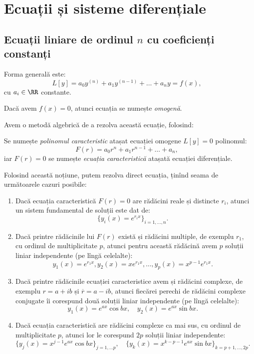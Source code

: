 
\chapter{Ecuații și sisteme diferențiale}

\section{Ecuații liniare de ordinul $n$ cu coeficienți constanți}

Forma generală este:
\[
  L[y] = a_0 y^{(n)} + a_1 y^{(n-1)} + \dots + a_n y = f(x),
\]
cu $a_i \in \RR$ constante.

Dacă avem $f(x) = 0$, atunci ecuația se numește \emph{omogenă}.

Avem o metodă algebrică de a rezolva această ecuație, folosind:

\begin{definition}\label{def:pol-car-ec}
  Se numește \emph{polinomul caracteristic} atașat ecuației omogene $L[y] = 0$
  polinomul:
  \[
    F(r) = a_0 r^n + a_1 r^{n-1} + \dots + a_n,
  \]
  iar $F(r) = 0$ se numește \emph{ecuația caracteristică} atașată ecuației diferențiale.
\end{definition}

Folosind această noțiune, putem rezolva direct ecuația, ținînd seama de următoarele
cazuri posibile:

\begin{theorem}\label{thm:ec-car-dif}
  \begin{enumerate}[(1)]
  \item Dacă ecuația caracteristică $F(r) = 0$ are rădăcini reale și distincte $r_i$,
    atunci un sistem fundamental de soluții este dat de:
    \[
      \big\{ y_i(x) = e^{r_i x} \big\}_{i=1,\dots,n}.
    \]
  \item Dacă printre rădăcinile lui $F(r)$ există și rădăcini multiple, de exemplu
    $r_1$, cu ordinul de multiplicitate $p$, atunci pentru această rădăcină avem
    $p$ soluții liniar independente (pe lîngă celelalte):
    \[
      y_1(x) = e^{r_1 x}, y_2(x) = xe^{r_1 x}, \dots, y_p(x) = x^{p-1} e^{r_1 x}.
    \]
  \item Dacă printre rădăcinile ecuației caracteristice avem și rădăcini complexe,
    de exemplu $r = a + ib$ și $\overline{r} = a - ib$, atunci fiecărei perechi
    de rădăcini complexe conjugate îi corespund două soluții liniar independente
    (pe lîngă celelalte):
    \[
      y_1(x) = e^{ax} \cos bx, \quad y_2(x) = e^{ax} \sin bx.
    \]
  \item Dacă ecuația caracteristică are rădăcini complexe ca mai sus, cu ordinul
    de multiplicitate $p$, atunci lor le corespund $2p$ soluții liniar independente:
    \[
      \big\{ y_j(x) = x^{j-1} e^{ax} \cos bx \big\}_{j=1, \dots p}, \quad
      \big\{ y_k(x) = x^{k-p-1} e^{ax} \sin bx\big\}_{k=p+1, \dots, 2p}.
    \]
  \end{enumerate}
\end{theorem}

